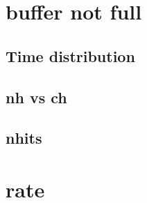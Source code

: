 \section{buffer not full}
\subsection{Time distribution}
\subsection{nh vs ch}
\subsection{nhits}

\section{rate}









